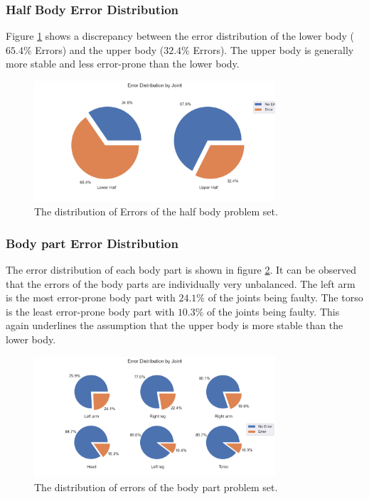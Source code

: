 \subsubsection{Half Body Error Distribution}

Figure \ref{fig:hb_pie} shows a discrepancy between the error distribution of the lower body ($65.4\%$ Errors) and the upper body ($32.4\%$ Errors). The upper body is generally more stable and less error-prone than the lower body.

\begin{figure}[ht]
  \centering
  \includegraphics[width=0.8\textwidth]{figures/Data/dist_half_body/Error_Distribution_by_Joint.png}
  \caption[Error Distribution by Body Half]{The distribution of Errors of the half body problem set.}
  \label{fig:hb_pie}
\end{figure}

\subsubsection{Body part Error Distribution}

The error distribution of each body part is shown in figure \ref{fig:lb_pie}. It can be observed that the errors of the body parts are individually very unbalanced. The left arm is the most error-prone body part with $24.1\%$ of the joints being faulty. The torso is the least error-prone body part with $10.3\%$ of the joints being faulty. This again underlines the assumption that the upper body is more stable than the lower body.

\begin{figure}[ht]
  \centering
  \includegraphics[width=0.8\textwidth]{figures/Data/dist_limbs/Error_Distribution_by_Joint.png}
  \caption[Error Distribution by Body part]{The distribution of errors of the body part problem set.}
  \label{fig:lb_pie}
\end{figure}

